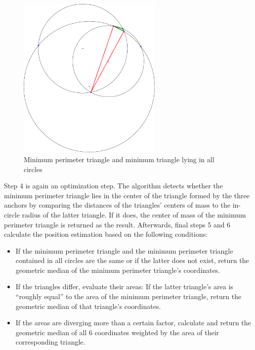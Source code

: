 \begin{figure}[h]
\begin{center}
\includegraphics[width=7cm]{img/geostep3}
\end{center}
\caption{Minimum perimeter triangle and minimum triangle lying in all circles}
\label{fig:geostep3}
\end{figure}

Step 4 is again an optimization step. The algorithm detects whether the minimum perimeter triangle lies in the center of the triangle formed by the three anchors by comparing the distances of the triangles' centers of mass to the in-circle radius of the latter triangle. If it does, the center of mass of the minimum perimeter triangle is returned as the result. Afterwards, final steps 5 and 6 calculate the position estimation based on the following conditions:
\begin{itemize}
\item If the minimum perimeter triangle and the minimum perimeter triangle contained in all circles are the same or if the latter does not exist, return the geometric median of the minimum perimeter triangle's coordinates.
\item If the triangles differ, evaluate their areas: If the latter triangle's area is ``roughly equal'' to the area of the minimum perimeter triangle, return the geometric median of that triangle's coordinates.
\item If the areas are diverging more than a certain factor, calculate and return the geometric median of all 6 coordinates weighted by the area of their corresponding triangle.
\end{itemize}

